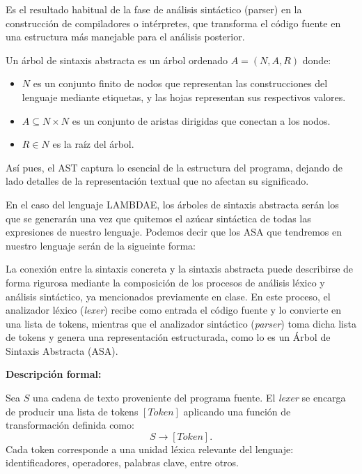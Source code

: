 \documentclass[a4paper,12pt]{article}
\begin{document}
Es el resultado habitual de la fase de análisis sintáctico (parser) en la construcción de compiladores o intérpretes, que transforma el código fuente en una estructura más manejable para el análisis posterior.

\begin{tcolorbox}[title=Definición: Árboles de sintaxis abstracta]
Un árbol de sintaxis abstracta es un árbol ordenado $A = (N, A, R)$ donde:

\begin{itemize}
    \item $N$ es un conjunto finito de nodos que representan las construcciones del lenguaje mediante etiquetas, y las hojas representan sus respectivos valores.
    
    \item $A \subseteq N \times N$ es un conjunto de aristas dirigidas que conectan a los nodos.
    
    \item $R \in N$ es la raíz del árbol.\cite{UNAMTesis,Dragon}
\end{itemize}
    
\end{tcolorbox}

Así pues, el AST captura lo esencial de la estructura del programa, dejando de lado detalles de la representación textual que no afectan su significado.


En el caso del lenguaje LAMBDAE, los árboles de sintaxis abstracta serán los que se generarán una vez que quitemos el azúcar sintáctica de todas las expresiones de  nuestro lenguaje. Podemos decir que los ASA que tendremos en nuestro lenguaje serán de la sigueinte forma: 







La conexión entre la sintaxis concreta y la sintaxis abstracta puede describirse de forma rigurosa mediante la composición de los procesos de análisis léxico y análisis sintáctico, ya mencionados previamente en clase. En este proceso, el analizador léxico (\textit{lexer}) recibe como entrada el código fuente y lo convierte en una lista de tokens, mientras que el analizador sintáctico (\textit{parser}) toma dicha lista de tokens y genera una representación estructurada, como lo es un Árbol de Sintaxis Abstracta (ASA).

\textbf{Descripción formal:}

Sea $S$ una cadena de texto proveniente del programa fuente. El \textit{lexer} se encarga de producir una lista de tokens $[Token]$ aplicando una función de transformación definida como:
\[
S \rightarrow [Token].
\]
Cada token corresponde a una unidad léxica relevante del lenguaje: identificadores, operadores, palabras clave, entre otros.
\end{document}
